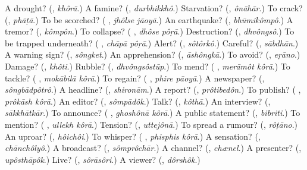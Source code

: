 \begin{tcolorbox}[breakable,colback=teal!4,colframe=teal!35!black,title={Before you move on}]
A drought? (\textbf{}, \emph{khôrā}.) A famine? (\textbf{}, \emph{durbhikkhô}.) Starvation? (\textbf{}, \emph{ônāhār}.) To crack? (\textbf{}, \emph{phāṭā}.) To be scorched? (\textbf{ }, \emph{jhôlse jāoyā}.) An earthquake? (\textbf{}, \emph{bhūmikômpô}.) A tremor? (\textbf{}, \emph{kômpôn}.) To collapse? (\textbf{ }, \emph{dhôse pôṛā}.) Destruction? (\textbf{}, \emph{dhvôngsô}.) To be trapped underneath? (\textbf{ }, \emph{chāpā pôṛā}.) Alert? (\textbf{}, \emph{sôtôrkô}.) Careful? (\textbf{}, \emph{sābdhān}.) A warning sign? (\textbf{}, \emph{sôngket}.) An apprehension? (\textbf{}, \emph{āshôngkā}.) To avoid? (\textbf{}, \emph{eṛāno}.) Damage? (\textbf{}, \emph{khôti}.) Rubble? (\textbf{}, \emph{dhvôngsôstūp}.) To mend? (\textbf{ }, \emph{merāmôt kôrā}.) To tackle? (\textbf{ }, \emph{mokābilā kôrā}.) To regain? (\textbf{ }, \emph{phire pāoyā}.) A newspaper? (\textbf{}, \emph{sôngbādpôtrô}.) A headline? (\textbf{}, \emph{shironām}.) A report? (\textbf{}, \emph{prôtibedôn}.) To publish? (\textbf{ }, \emph{prôkāsh kôrā}.) An editor? (\textbf{}, \emph{sômpādôk}.) Talk? (\textbf{}, \emph{kôthā}.) An interview? (\textbf{}, \emph{sākkhātkār}.) To announce? (\textbf{ }, \emph{ghoshônā kôrā}.) A public statement? (\textbf{}, \emph{bibriti}.) To mention? (\textbf{ }, \emph{ullekh kôrā}.) Tension? (\textbf{}, \emph{uttejônā}.) To spread a rumour? (\textbf{}, \emph{rôṭāno}.) An uproar? (\textbf{}, \emph{hôichôi}.) To whisper? (\textbf{ }, \emph{phisphis kôrā}.) A sensation? (\textbf{}, \emph{chānchôlyô}.) A broadcast? (\textbf{}, \emph{sômprôchār}.) A channel? (\textbf{}, \emph{chænel}.) A presenter? (\textbf{}, \emph{upôsthāpôk}.) Live? (\textbf{}, \emph{sôrāsôri}.) A viewer? (\textbf{}, \emph{dôrshôk}.)
\end{tcolorbox}
